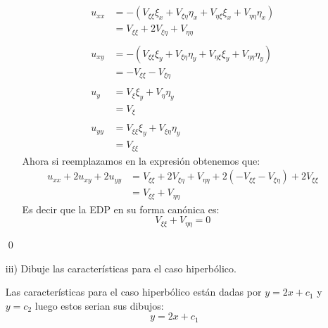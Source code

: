 \begin{homeworkProblem}
\begin{itemize}
\begin{solucion}
\begin{itemize}
\begin{align*}
                  \\
                  u_{xx}&=-(V_{\xi\xi}\xi_x+V_{\xi\eta}\eta_x+V_{\eta\xi}\xi_x+V_{\eta\eta}\eta_x)\\
                  &=V_{\xi\xi}+2V_{\xi\eta}+V_{\eta\eta}\\
                  \\
                  u_{xy}&=-(V_{\xi\xi}\xi_y+V_{\xi\eta}\eta_y+V_{\eta\xi}\xi_y+V_{\eta\eta}\eta_y)\\
                  &=-V_{\xi\xi}-V_{\xi\eta}\\
                  \\
                  u_y&=V_\xi\xi_y+V_\eta\eta_y\\
                  &=V_\xi\\
                  \\
                  u_{yy}&=V_{\xi\xi}\xi_y+V_{\xi\eta}\eta_y\\
                  &=V_{\xi\xi}
             \end{align*}
             Ahora si reemplazamos en la expresión obtenemos que:
             \begin{align*}
                 u_{xx}+2u_{xy}+2u_{yy}&=V_{\xi\xi}+2V_{\xi\eta}+V_{\eta\eta}+2(-V_{\xi\xi}-V_{\xi\eta})+2V_{\xi\xi}\\
                &=V_{\xi\xi}+V_{\eta\eta}
             \end{align*}
             Es decir que la EDP en su forma canónica es:
             $$V_{\xi\xi}+V_{\eta\eta}=0$$
            \end{itemize}
            \qed
        \end{solucion}
        \item [iii)] Dibuje las características para el caso hiperbólico.
        \begin{solucion}
            Las características para el caso hiperbólico están dadas por $y=2x+c_1$ y $y=c_2$ luego estos serian sus dibujos:
            \pagebreak
            $$y=2x+c_1$$
                \centering

\end{solucion}
\end{itemize}
\end{homeworkProblem}
